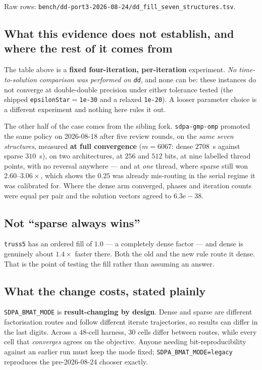 \documentclass[11pt]{article}
\newcommand{\code}[1]{\texttt{#1}}
\begin{document}
Raw rows: \code{bench/dd-port3-2026-08-24/dd\_fill\_seven\_structures.tsv}.

\subsection{What this evidence does not establish, and where the rest of it comes from}

The table above is a \textbf{fixed four-iteration, per-iteration} experiment. \emph{No
time-to-solution comparison was performed on \code{dd}}, and none can be: these instances do not
converge at double-double precision under either tolerance tested (the shipped
\code{epsilonStar}${}={}$\code{1e-30} and a relaxed \code{1e-20}). A looser parameter choice is a
different experiment and nothing here rules it out.

The other half of the case comes from the sibling fork. \code{sdpa-gmp-omp} promoted the same
policy on 2026-08-18 after five review rounds, on the \emph{same seven structures}, measured
\textbf{at full convergence} ($m{=}6067$: dense $2708$~s against sparse $310$~s), on two
architectures, at $256$ and $512$ bits, at nine labelled thread points, with no reversal anywhere
--- and at \emph{one} thread, where sparse still won $2.60$--$3.06\times$, which shows the $0.25$
was already mis-routing in the serial regime it was calibrated for. Where the dense arm converged,
phases and iteration counts were equal per pair and the solution vectors agreed to
$6.3\mathrm{e}{-}38$.

\subsection{Not ``sparse always wins''}

\code{truss5} has an ordered fill of $1.0$ --- a completely dense factor --- and dense is genuinely
about $1.4\times$ faster there. Both the old and the new rule route it dense. That is the point of
testing the fill rather than assuming an answer.

\subsection{What the change costs, stated plainly}

\code{SDPA\_BMAT\_MODE} is \textbf{result-changing by design}. Dense and sparse are different
factorisation routes and follow different iterate trajectories, so results can differ in the last
digits. Across a $48$-cell harness, $30$ cells differ between routes, while every cell that
\emph{converges} agrees on the objective. Anyone needing bit-reproducibility against an earlier run
must keep the mode fixed; \code{SDPA\_BMAT\_MODE=legacy} reproduces the pre-2026-08-24 chooser
exactly.
\end{document}

